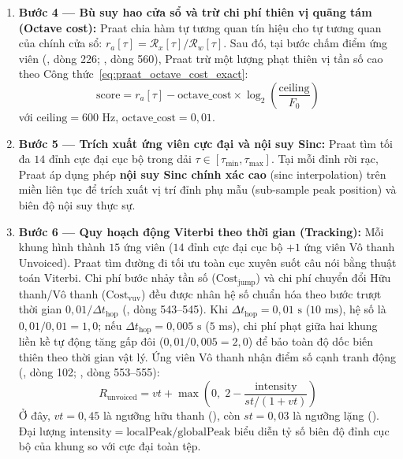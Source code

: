 \documentclass[11pt,a4paper]{article}
\begin{document}
\begin{enumerate}
    \item \textbf{Bước 4 --- Bù suy hao cửa sổ và trừ chi phí thiên vị quãng tám (Octave cost):}
    Praat chia hàm tự tương quan tín hiệu cho tự tương quan của chính cửa sổ: $r_a[\tau] = \mathcal{R}_x[\tau] / \mathcal{R}_w[\tau]$. Sau đó, tại bước chấm điểm ứng viên (, dòng 226; , dòng 560), Praat trừ một lượng phạt thiên vị tần số cao theo Công thức~\eqref{eq:praat_octave_cost_exact}:
    \[
    \text{score} = r_a[\tau] - \text{octave\_cost} \times \log_2\left(\frac{\text{ceiling}}{F_0}\right)
    \]
    với $\text{ceiling} = 600\text{ Hz}$, $\text{octave\_cost} = 0{,}01$.
    \item \textbf{Bước 5 --- Trích xuất ứng viên cực đại và nội suy Sinc:}
    Praat tìm tối đa $14$ đỉnh cực đại cục bộ trong dải $\tau \in [\tau_{\min}, \tau_{\max}]$. Tại mỗi đỉnh rời rạc, Praat áp dụng phép \textbf{nội suy Sinc chính xác cao} (sinc interpolation) trên miền liên tục để trích xuất vị trí đỉnh phụ mẫu (sub-sample peak position) và biên độ nội suy thực sự.
    \item \textbf{Bước 6 --- Quy hoạch động Viterbi theo thời gian (Tracking):}
    Mỗi khung hình thành $15$ ứng viên ($14$ đỉnh cực đại cục bộ $+ 1$ ứng viên Vô thanh Unvoiced). Praat tìm đường đi tối ưu toàn cục xuyên suốt câu nói bằng thuật toán Viterbi. Chi phí bước nhảy tần số ($\text{Cost}_{\text{jump}}$) và chi phí chuyển đổi Hữu thanh/Vô thanh ($\text{Cost}_{\text{vuv}}$) đều được nhân hệ số chuẩn hóa theo bước trượt thời gian $0{,}01 / \Delta t_{\text{hop}}$ (, dòng 543--545). Khi $\Delta t_{\text{hop}} = 0{,}01\text{ s}$ ($10\text{ ms}$), hệ số là $0{,}01 / 0{,}01 = 1{,}0$; nếu $\Delta t_{\text{hop}} = 0{,}005\text{ s}$ ($5\text{ ms}$), chi phí phạt giữa hai khung liền kề tự động tăng gấp đôi ($0{,}01 / 0{,}005 = 2{,}0$) để bảo toàn độ dốc biến thiên theo thời gian vật lý. Ứng viên Vô thanh nhận điểm số cạnh tranh động (, dòng 102; , dòng 553--555):
    \begin{equation}
    R_{\text{unvoiced}} = vt + \max\left(0, \; 2 - \frac{\text{intensity}}{st / (1 + vt)}\right)
    \label{eq:praat_unvoiced_dynamic}
    \end{equation}
    Ở đây, $vt = 0{,}45$ là ngưỡng hữu thanh (), còn $st = 0{,}03$ là ngưỡng lặng (). Đại lượng $\text{intensity} = \text{localPeak}/\text{globalPeak}$ biểu diễn tỷ số biên độ đỉnh cục bộ của khung so với cực đại toàn tệp.
    

\end{enumerate}
\end{document}
